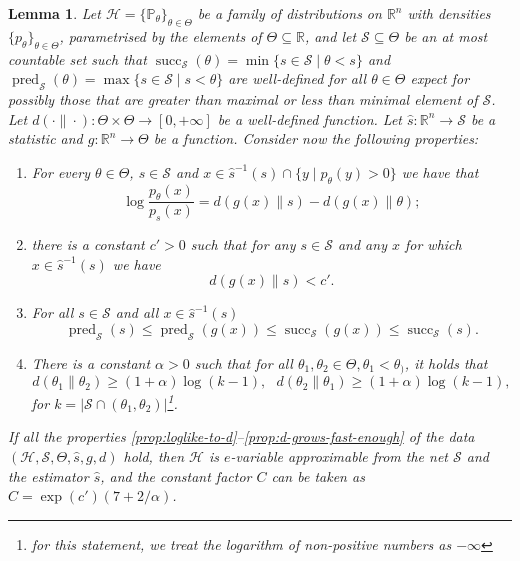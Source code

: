 \documentclass{article}
\newtheorem{lemma}{Lemma}
\theoremstyle{definition}
\theoremstyle{definition}
\newcommand{\reals}{\mathbb{R}}
\newcommand{\probP}{\mathbb{P}}
\begin{document}
\begin{lemma}\label{lem:4-cond-techn-lemma}
    Let $\mathcal{H} = \{\probP_\theta\}_{\theta\in\Theta}$ be a family of distributions on $\reals^n$ with densities $\{p_\theta\}_{\theta\in\Theta}$, parametrised by the elements of $\Theta\subseteq\reals$, and let $\mathcal{S} \subseteq \Theta$ be an at most countable set such that $\operatorname{succ}_{\mathcal{S}}(\theta)=\min\{s\in\mathcal{S}\mid\theta<s\}$ and $\operatorname{pred}_{\mathcal{S}}(\theta)=\max\{s\in\mathcal{S}\mid s<\theta\}$ are well-defined for all $\theta\in\Theta$ expect for possibly those that are greater than maximal or less than minimal element of $\mathcal{S}$. Let $d(\cdot\|\cdot):\Theta\times\Theta\to [0, +\infty]$ be a well-defined function. Let $\hat s:\reals^n\to \mathcal{S}$ be a statistic and $g:\reals^n\to\Theta$ be a function.
    Consider now the following properties:
    \begin{enumerate}[label=(p \roman*)]
        \item\label{prop:loglike-to-d} For every $\theta \in\Theta$, $s \in \mathcal{S}$ and $x\in \hat{s}^{-1}(s) \cap \{y\mid p_\theta(y)>0\}$ we have that
        \[
            \log\frac{p_\theta(x)}{p_{s}(x)} = d(g(x)\|s)-d(g(x)\|\theta);
        \]
        \item\label{prop:near-bound} there is a constant $c' > 0$ such that for any $s \in \mathcal{S}$ and any $x$ for which $x \in \hat s^{-1}(s)$ we have
        \[
            d(g(x)\|s) < c'.
        \]
        \item\label{prop:g-near-s} For all $s\in\mathcal{S}$ and all $x \in \hat s^{-1}(s)$
        \[
            \operatorname{pred}_{\mathcal{S}}(s)\le \operatorname{pred}_{\mathcal{S}}(g(x))\le \operatorname{succ}_{\mathcal{S}}(g(x))\le \operatorname{succ}_{\mathcal{S}}(s).
        \]
        \item\label{prop:d-grows-fast-enough} There is a constant $\alpha >0$ such that for all $\theta_1, \theta_2 \in \Theta, \theta_1 < \theta_)$, it holds that
        \[
            d(\theta_1\|\theta_2) \ge (1+\alpha)\log (k-1), ~~~ d(\theta_2\|\theta_1) \ge (1+\alpha)\log (k-1),
        \]
        for $k = \left| \mathcal{S} \cap (\theta_1, \theta_2) \right|$\footnote{for this statement, we treat the logarithm of non-positive numbers as $-\infty$}.
    \end{enumerate}

    If all the properties \ref{prop:loglike-to-d}--\ref{prop:d-grows-fast-enough} of the data $(\mathcal{H}, \mathcal{S}, \Theta, \hat{s}, g, d)$ hold, then $\mathcal{H}$ is $e$-variable approximable from the net $\mathcal{S}$ and the estimator $\hat s$, and the constant factor $C$ can be taken as $C =\exp(c')\left(7 +  2/\alpha\right)$.
\end{lemma}
\end{document}
